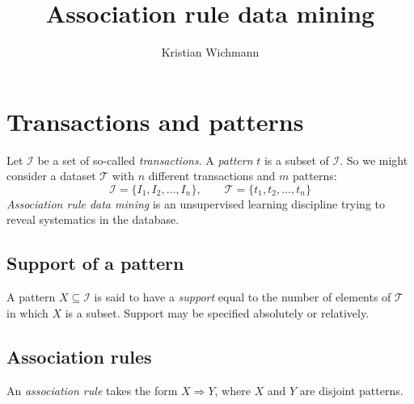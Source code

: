 \documentclass[12pt, a4paper]{article}
\title{Association rule data mining}
\author{Kristian Wichmann}
\numberwithin{equation}{section}
\begin{document}
\maketitle

\section{Transactions and patterns}
Let $\mathcal{I}$ be a set of so-called \textit{transactions}. A \textit{pattern} $t$ is a subset of $\mathcal{I}$. So we might consider a dataset $\mathcal{T}$ with $n$ different transactions and $m$ patterns:
\begin{equation}
\mathcal{I}=\{I_1, I_2,\ldots,I_n\},\qquad \mathcal{T}=\{t_1, t_2,\ldots,t_n\}
\end{equation}
\textit{Association rule data mining} is an unsupervised learning discipline trying to reveal systematics in the database.

\subsection{Support of a pattern}
A pattern $X\subseteq\mathcal{I}$ is said to have a \textit{support} equal to the number of elements of $\mathcal{T}$ in which $X$ is a subset. Support may be specified absolutely or relatively.

\subsection{Association rules}
An \textit{association rule} takes the form $X\Rightarrow Y$, where $X$ and $Y$ are disjoint patterns.
\end{document}
